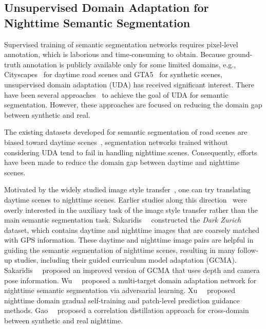 \documentclass[10pt,twocolumn,letterpaper]{article}
\begin{document}
\subsection{Unsupervised Domain Adaptation for Nighttime Semantic Segmentation}
Supervised training of semantic segmentation networks requires pixel-level annotation, which is laborious and time-consuming to obtain. Because ground-truth annotation is publicly available only for some limited domains, e.g., Cityscapes~\cite{Cordts2016Cityscapes} for daytime road scenes and GTA5~\cite{richter2016GTA} for synthetic scenes, unsupervised domain adaptation (UDA) has received significant interest. There have been several approaches~\cite{tsai2019domain,Lee2021content} to achieve the goal of UDA for semantic segmentation. However, these approaches are focused on reducing the domain gap between synthetic and real. 

The existing datasets developed for semantic segmentation of road scenes are biased toward daytime scenes~\cite{Cordts2016Cityscapes,Geiger2013kitti}, segmentation networks trained without considering UDA tend to fail in handling nighttime scenes. Consequently, efforts have been made to reduce the domain gap between daytime and nighttime scenes.

Motivated by the widely studied image style transfer~\cite{jeong2021memory,jiang2020tsit,liu2017unit}, one can try translating daytime scenes to nighttime scenes. Earlier studies along this direction~\cite{romera2019bridging,sun2019see} were overly interested in the auxiliary task of the image style transfer rather than the main semantic segmentation task. Sakaridis~\etal~\cite{sakaridis2019guided} constructed the \textit{Dark Zurich} dataset, which contains daytime and nighttime images that are coarsely matched with GPS information. These daytime and nighttime image pairs are helpful in guiding the semantic segmentation of nighttime scenes, resulting in many follow-up studies, including their guided curriculum model adaptation (GCMA). Sakaridis~\etal~\cite{sakaridis2020map-guided} proposed an improved version of GCMA that uses depth and camera pose information. Wu~\etal~\cite{wu2021dannet} proposed a multi-target domain adaptation network for nighttime semantic segmentation via adversarial learning. Xu~\etal~\cite{xu2021cdada} proposed nighttime domain gradual self-training and patch-level prediction guidance methods. Gao~\etal~\cite{gao2022ccdistill} proposed a correlation distillation approach for cross-domain between synthetic and real nighttime.
\end{document}
